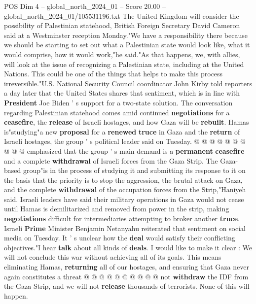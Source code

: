 \begin{textsample}{POS Dim 4 – global\_north\_2024\_01 – Score 20.00 – global\_north\_2024\_01/105531196.txt}  \label{ex:f4_pos_335}
The United Kingdom will consider the possibility of Palestinian statehood, British Foreign Secretary David Cameron said at a Westminster reception Monday."We have a responsibility there because we should be starting to set out what a Palestinian state would look like, what it would comprise, how it would work,"he said."As that happens, we, with allies, will look at the issue of recognizing a Palestinian state, including at the United Nations.
This could be one of the things that helps to make this process irreversible."U.S.
National Security Council coordinator John Kirby told reporters a day later that the United States shares that sentiment, which is in line with \textbf{President} Joe Biden ' s support for a two-state solution.
The conversation regarding Palestinian statehood comes amid continued \textbf{negotiations} for a \textbf{ceasefire}, the \textbf{release} of Israeli hostages, and how Gaza will be \textbf{rebuilt}.
Hamas is"studying"a new \textbf{proposal} for a \textbf{renewed} \textbf{truce} in Gaza and the \textbf{return} of Israeli hostages, the group ' s political leader said on Tuesday. @ @ @ @ @ @ @ @ @ @ emphasized that the group ' s main demand is a \textbf{permanent} \textbf{ceasefire} and a complete \textbf{withdrawal} of Israeli forces from the Gaza Strip.
The Gaza-based group"is in the process of studying it and submitting its response to it on the basis that the priority is to stop the aggression, the brutal attack on Gaza, and the complete \textbf{withdrawal} of the occupation forces from the Strip,"Haniyeh said.
Israeli leaders have said their military operations in Gaza would not cease until Hamas is demilitarized and removed from power in the strip, making \textbf{negotiations} difficult for intermediaries attempting to broker another \textbf{truce}.
Israeli \textbf{Prime} Minister Benjamin Netanyahu reiterated that sentiment on social media on Tuesday.
It ' s unclear how the \textbf{deal} would satisfy their conflicting objectives."I hear \textbf{talk} about all kinds of \textbf{deals}.
I would like to make it clear : We will not conclude this war without achieving all of its goals.
This means eliminating Hamas, \textbf{returning} all of our hostages, and ensuring that Gaza never again constitutes a threat @ @ @ @ @ @ @ @ @ @ not \textbf{withdraw} the IDF from the Gaza Strip, and we will not \textbf{release} thousands of terrorists.
None of this will happen.

\end{textsample}
